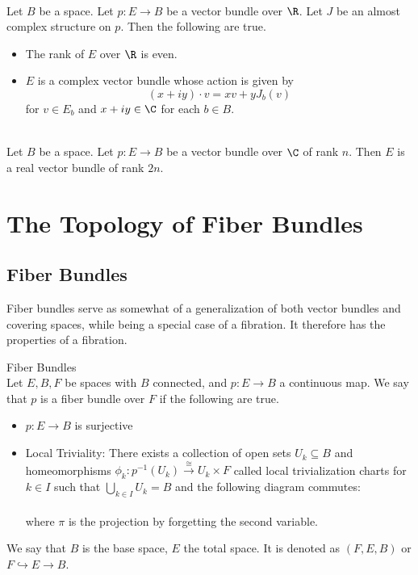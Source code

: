 \documentclass[a4paper]{article}
\begin{document}
\begin{prp}{}{}\\
Let $B$ be a space. Let $p:E\to B$ be a vector bundle over $\R$. Let $J$ be an almost complex structure on $p$. Then the following are true. 
\begin{itemize}
\item The rank of $E$ over $\R$ is even. 
\item $E$ is a complex vector bundle whose action is given by $$(x+iy)\cdot v=xv+yJ_b(v)$$ for $v\in E_b$ and $x+iy\in\C$ for each $b\in B$. 
\end{itemize}
\end{prp}

\begin{prp}{}{}\\
Let $B$ be a space. Let $p:E\to B$ be a vector bundle over $\C$ of rank $n$. Then $E$ is a real vector bundle of rank $2n$. 
\end{prp}

\pagebreak
\section{The Topology of Fiber Bundles}
\subsection{Fiber Bundles}
Fiber bundles serve as somewhat of a generalization of both vector bundles and covering spaces, while being a special case of a fibration. It therefore has the properties of a fibration. 

\begin{defn}{Fiber Bundles}{}\\
Let $E,B,F$ be spaces with $B$ connected, and $p:E\to B$ a continuous map. We say that $p$ is a fiber bundle over $F$ if the following are true. 
\begin{itemize}
\item $p:E\to B$ is surjective
\item Local Triviality: There exists a collection of open sets $U_k\subseteq B$ and homeomorphisms $\phi_k:p^{-1}(U_k)\overset{\cong}{\to}U_k\times F$ called local trivialization charts for $k\in I$ such that $\bigcup_{k\in I}U_k=B$ and the following diagram commutes: \\
\\
where $\pi$ is the projection by forgetting the second variable. 
\end{itemize}
We say that $B$ is the base space, $E$ the total space. It is denoted as $(F,E,B)$ or $F\hookrightarrow E\to B$. 
\end{defn}
\end{document}

